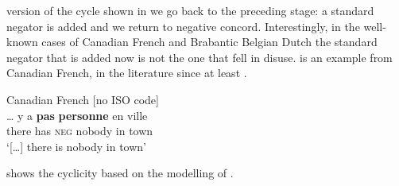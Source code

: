﻿\documentclass[output=paper,draft,draftmode,colorlinks,citecolor=brown]{langscibook}
\begin{document}
version of the cycle shown in  we go back to the
preceding stage: a standard negator is added and we return to negative
concord.  Interestingly, in the well-known cases of Canadian French and
Brabantic Belgian Dutch \parencite[e.g.][499]{AuweraAlsenoy2016} the
standard negator that is added now is not the one that fell in disuse.
 is an example from Canadian French, in
the literature since at least \citet[262--263]{Muller1991}.
%
\begin{exe}\ex\label{ex:int-canadian-town}
Canadian French [no ISO code] 
\\
    \gll \ldots{} y a \textbf{pas} \textbf{personne} en ville \\
    {} there  has  \textsc{neg}  nobody    in  town \\
    \glt `[…] there is nobody in town'
    \end{exe} 

 shows the cyclicity based on the modelling
of .
\end{document}
